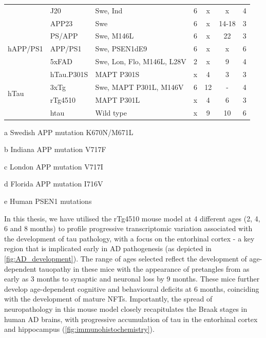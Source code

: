 \begin{table}[h]
\begin{threeparttable}
\begin{tabular}{@{}lllcccc@{}}
			& J20                   & Swe\tnote{a}, Ind\tnote{b} & 6  & x  & x     & 4                \\
			& APP23                 & Swe\tnote{a}               & 6  & x  & 14-18 & 3                \\
			\multirow{3}{*}{hAPP/PS1} & PS/APP & Swe\tnote{a}, M146L\tnote{e}                 & 6  & x  & 22    & 3                \\
			& APP/PS1         & Swe\tnote{a}, PSEN1dE9              & 6  & x  & x     & 6                \\
			& 5xFAD                 & Swe\tnote{a}, Lon\tnote{c}, Flo\tnote{d}, M146L\tnote{e}, L28V\tnote{e} & 2  & x  & 9     & 4                \\
			\multirow{4}{*}{hTau}     & hTau.P301S            & MAPT P301S                 & x  & 4  & 3     & 3                \\
			& 3xTg                  & Swe\tnote{a}, MAPT P301L, M146V\tnote{e}     & 6  & 12 & -    & 4                \\
			& rTg4510               & MAPT P301L                 & x  & 4  & 6     & 3                \\
			& htau                  & Wild type                   & x  & 9  & 10    & 6                \\ \cmidrule(l){1-7} 
		\end{tabular}
		\begin{tablenotes}
			\footnotesize
			\item[a] Swedish APP mutation K670N/M671L
			\item[b] Indiana APP mutation V717F
			\item[c] London APP mutation V717I
			\item[d] Florida APP mutation I716V 
			\item[e] Human PSEN1 mutations 
		\end{tablenotes}
	\end{threeparttable}
\end{table}

In this thesis, we have utilised the rTg4510 mouse model at 4 different ages (2, 4, 6 and 8 months) to profile progressive transcriptomic variation associated with the development of tau pathology, with a focus on the entorhinal cortex - a key region that is implicated early in AD pathogenesis (as depicted in \cref{fig:AD_development}). The range of ages selected reflect the development of age-dependent tauopathy in these mice with the appearance of pretangles from as early as 3 months to synaptic and neuronal loss by 9 months. These mice further develop age-dependent cognitive and behavioural deficits at 6 months, coinciding with the development of mature NFTs\cite{Cook2014}. Importantly, the spread of neuropathology in this mouse model closely recapitulates the Braak stages in human AD brains, with progressive accumulation of tau in the entorhinal cortex and hippocampus (\cref{fig:immunohistochemistry}). 

